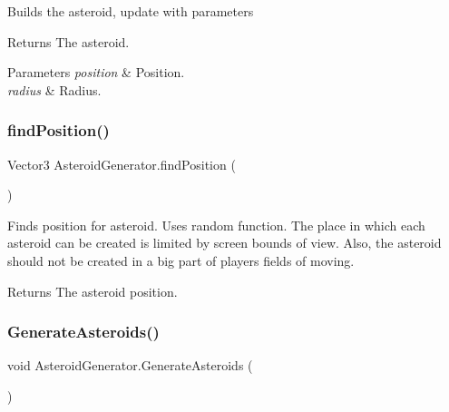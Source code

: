 Builds the asteroid, update with parameters 

\begin{DoxyReturn}{Returns}
The asteroid.
\end{DoxyReturn}

\begin{DoxyParams}{Parameters}
{\em position} & Position.\\
\hline
{\em radius} & Radius.\\
\hline
\end{DoxyParams}
\mbox{\label{class_asteroid_generator_ae494004ca219dbbe8333f2e3e5cc7887}} 
\subsubsection{\texorpdfstring{find\+Position()}{findPosition()}}
{\footnotesize\ttfamily Vector3 Asteroid\+Generator.\+find\+Position (\begin{DoxyParamCaption}{ }\end{DoxyParamCaption})\hspace{0.3cm}{\ttfamily [private]}}



Finds position for asteroid. Uses random function. The place in which each asteroid can be created is limited by screen bounds of view. Also, the asteroid should not be created in a big part of players\textquotesingle{} fields of moving. 

\begin{DoxyReturn}{Returns}
The asteroid position.
\end{DoxyReturn}
\mbox{\label{class_asteroid_generator_ac7589dbfe747647e96258ae54a881d82}} 
\subsubsection{\texorpdfstring{Generate\+Asteroids()}{GenerateAsteroids()}}
{\footnotesize\ttfamily void Asteroid\+Generator.\+Generate\+Asteroids (\begin{DoxyParamCaption}{ }\end{DoxyParamCaption})\hspace{0.3cm}{\ttfamily [private]}}



